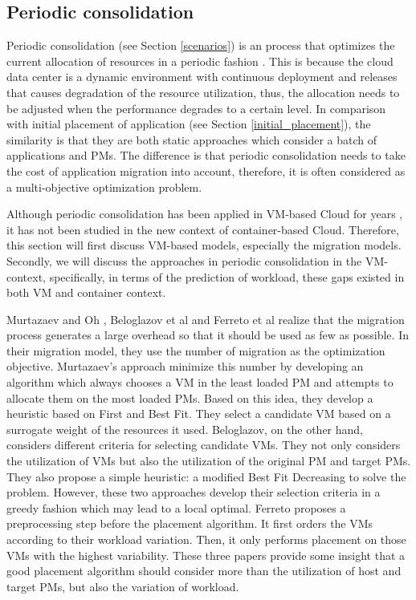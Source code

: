 \subsection{Periodic consolidation}
Periodic consolidation (see Section \ref{scenarios}) is an process that optimizes the current allocation of resources in a periodic fashion \cite{Mishra:2012kx}. This is because the cloud data center is a dynamic environment with continuous deployment and releases that causes degradation of the resource utilization, thus, the allocation needs to be adjusted when the performance degrades to a certain level. In comparison with initial placement of application (see Section \ref{initial_placement}), the similarity is that they are both static approaches which consider a batch of applications and PMs. The difference is that periodic consolidation needs to take the cost of application migration into account, therefore, it is often considered as a multi-objective optimization problem. 

Although periodic consolidation has been applied in VM-based Cloud for years \cite{Murtazaev:2014eo,Ferreto:2011ii}, it has not been studied in the new context of container-based Cloud. Therefore, this section will first discuss VM-based models, especially the migration models. Secondly, we will discuss the approaches in periodic consolidation in the VM-context, specifically, in terms of the prediction of workload, these gaps existed in both VM and container context. 


Murtazaev and Oh \cite{Murtazaev:2014eo}, Beloglazov et al \cite{Beloglazov:2012ji} and Ferreto et al \cite{Ferreto:2011ii} realize that the migration process generates a large overhead so that it should be used as few as possible. In their migration model, they use the number of migration as the optimization objective. Murtazaev's approach minimize this number by developing an algorithm which always chooses a VM in the least loaded PM and attempts to allocate them on the most loaded PMs. Based on this idea, they develop a heuristic based on First and Best Fit. They select a candidate VM based on a surrogate weight of the resources it used.
Beloglazov, on the other hand, considers different criteria for selecting candidate VMs. They not only considers the utilization of VMs but also the utilization of the original PM and target PMs. They also propose a simple heuristic: a modified Best Fit Decreasing to solve the problem. However, these two approaches develop their selection criteria in a greedy fashion which may lead to a local optimal. 
Ferreto proposes a preprocessing step before the placement algorithm. It first orders the VMs according to their workload variation. Then, it only performs placement on those VMs with  the highest variability. These three papers provide some insight that a good placement algorithm should consider more than the utilization of host and target PMs, but also the variation of workload. 

